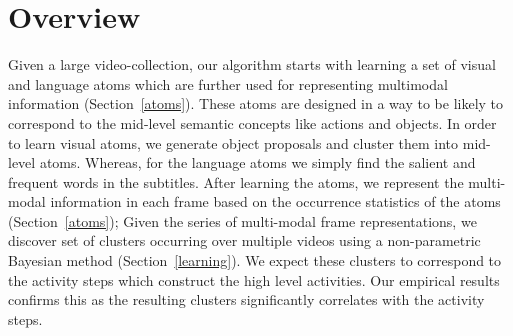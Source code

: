 
\vspace{-1mm}
\section{Overview}
\label{sec:overview}
\vspace{-1mm}


Given a large video-collection, our algorithm starts with learning a set of visual and language atoms which are further used for representing multimodal information (Section~\ref{atoms}). These atoms are designed in a way to be likely to correspond to the mid-level semantic concepts like actions and objects. In order to learn visual atoms, we generate object proposals and cluster them into mid-level atoms. Whereas, for the language atoms we simply find the salient and frequent words in the subtitles. After learning the atoms, we represent the multi-modal information in each frame based on the occurrence statistics of the atoms (Section~\ref{atoms}); Given the series of multi-modal frame representations, we discover set of clusters occurring over multiple videos using a non-parametric Bayesian method (Section~\ref{learning}). We expect these clusters to correspond to the activity steps which construct the high level activities. Our empirical results confirms this as the resulting clusters significantly correlates with the activity steps.



